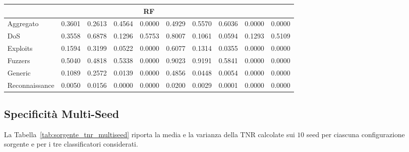 \begin{table}[H]
{\begin{tabular}{lccccccccc}
        \multicolumn{10}{c}{\textbf{RF}} \\
        \midrule
        Aggregato      & 0.3601 & 0.2613 & 0.4564 & 0.0000 & 0.4929 & 0.5570 & 0.6036 & 0.0000 & 0.0000 \\
        DoS            & 0.3558 & 0.6878 & 0.1296 & 0.5753 & 0.8007 & 0.1061 & 0.0594 & 0.1293 & 0.5109 \\
        Exploits       & 0.1594 & 0.3199 & 0.0522 & 0.0000 & 0.6077 & 0.1314 & 0.0355 & 0.0000 & 0.0000 \\
        Fuzzers        & 0.5040 & 0.4818 & 0.5338 & 0.0000 & 0.9023 & 0.9191 & 0.5841 & 0.0000 & 0.0000 \\
        Generic        & 0.1089 & 0.2572 & 0.0139 & 0.0000 & 0.4856 & 0.0448 & 0.0054 & 0.0000 & 0.0000 \\
        Reconnaissance & 0.0050 & 0.0156 & 0.0000 & 0.0000 & 0.0200 & 0.0029 & 0.0001 & 0.0000 & 0.0000 \\
        \bottomrule
    \end{tabular}
    }
\end{table}


\subsection{Specificità Multi-Seed}

La Tabella~\ref{tab:sorgente_tnr_multiseed} riporta la media e la varianza della TNR calcolate sui $10$ seed per ciascuna configurazione sorgente e per i tre classificatori considerati.

